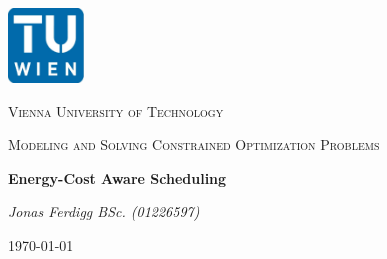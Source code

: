 
\begin{titlepage}
	\centering
	\includegraphics[width=0.15\textwidth]{./img/logo_tuwien.png}\par\vspace{1cm}
	{\scshape\LARGE Vienna University of Technology \par}
	\vspace{1cm}
	{\scshape\Large Modeling and Solving Constrained Optimization Problems \par}
	\vspace{1.5cm}
	{\huge\bfseries Energy-Cost Aware Scheduling  \par}
	\vspace{2cm}
	{\Large\itshape Jonas Ferdigg BSc. (01226597) \par}
	\vfill
	\vspace*{1ex}
	{\large \today\par}
\end{titlepage}

